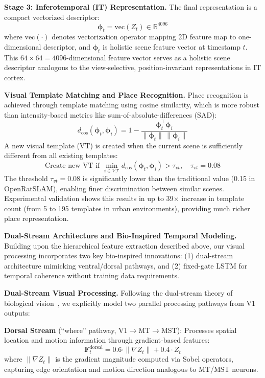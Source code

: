 \textbf{Stage 3: Inferotemporal (IT) Representation.} The final representation is a compact vectorized descriptor:
\begin{equation}
    \boldsymbol{\phi}_t=\mathrm{vec}(Z_t)\in\mathbb{R}^{4096}
\end{equation}
where $\mathrm{vec}(\cdot)$ denotes vectorization operator mapping 2D feature map to one-dimensional descriptor, and $\boldsymbol{\phi}_t$ is holistic scene feature vector at timestamp $t$.
This $64 \times 64 = 4096$-dimensional feature vector serves as a holistic scene descriptor analogous to the view-selective, position-invariant representations in IT cortex.

\textbf{Visual Template Matching and Place Recognition.} Place recognition is achieved through template matching using cosine similarity, which is more robust than intensity-based metrics like sum-of-absolute-differences (SAD):
\begin{equation}
    d_{\cos}(\boldsymbol{\phi}_t,\boldsymbol{\phi}_i)=1-\frac{\boldsymbol{\phi}_t^\top\boldsymbol{\phi}_i}{\lVert\boldsymbol{\phi}_t\rVert\,\lVert\boldsymbol{\phi}_i\rVert}
\end{equation}
A new visual template (VT) is created when the current scene is sufficiently different from all existing templates:
\begin{equation}
    \text{Create new VT if }\min_{i \in \mathcal{VT}} d_{\cos}(\boldsymbol{\phi}_t, \boldsymbol{\phi}_i)>\tau_{vt},\quad \tau_{vt}=0.08
\end{equation}
The threshold $\tau_{vt}=0.08$ is significantly lower than the traditional value (0.15 in OpenRatSLAM), enabling finer discrimination between similar scenes. Experimental validation shows this results in up to 39$\times$ increase in template count (from 5 to 195 templates in urban environments), providing much richer place representation.

\textbf{Dual-Stream Architecture and Bio-Inspired Temporal Modeling.} Building upon the hierarchical feature extraction described above, our visual processing incorporates two key bio-inspired innovations: (1) dual-stream architecture mimicking ventral/dorsal path\-ways, and (2) fixed-gate LSTM for temporal coherence without training data requirements.

\textbf{Dual-Stream Visual Processing.}
Following the dual-stream theory of biological vision~\cite{Goodale1992, Mishkin1983}, we explicitly model two parallel processing path\-ways from V1 outputs:

\textbf{Dorsal Stream} (``where'' pathway, V1$\rightarrow$MT$\rightarrow$MST): Processes spatial location and motion information through gradient-based features:
\begin{equation}
    \mathbf{F}^{\text{dorsal}}_t = 0.6 \cdot \|\nabla Z_t\| + 0.4 \cdot Z_t
\end{equation}
where $\|\nabla Z_t\|$ is the gradient magnitude computed via Sobel operators, capturing edge orientation and motion direction analogous to MT/MST neurons.

